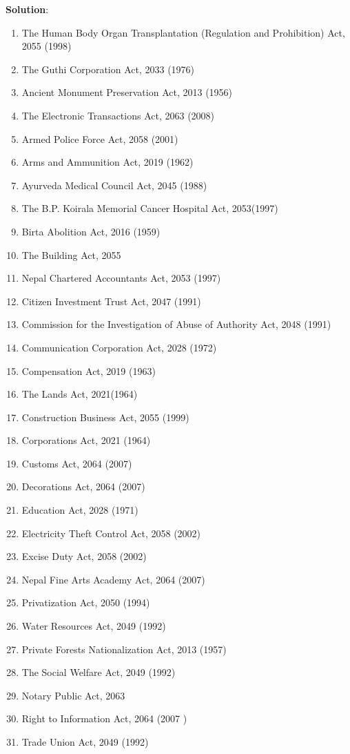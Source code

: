 \documentclass[
  openany]{book}
\newenvironment{solution}{ {\bfseries Solution}:}{}
\begin{document}
\begin{questions}
\begin{solution}
\begin{enumerate}
\item The Human Body Organ Transplantation (Regulation and Prohibition) Act, 2055 (1998)
\item The Guthi Corporation Act, 2033 (1976)
\item Ancient Monument Preservation Act, 2013 (1956)
\item The Electronic Transactions Act, 2063 (2008)
\item Armed Police Force Act, 2058 (2001)
\item Arms and Ammunition Act, 2019 (1962)
\item Ayurveda Medical Council Act, 2045 (1988)
\item The B.P. Koirala Memorial Cancer Hospital Act, 2053(1997)
\item Birta Abolition Act, 2016 (1959)
\item The Building Act, 2055
\item Nepal Chartered Accountants Act, 2053 (1997)
\item Citizen Investment Trust Act, 2047 (1991)
\item Commission for the Investigation of Abuse of Authority Act, 2048 (1991)
\item Communication Corporation Act, 2028 (1972)
\item Compensation Act, 2019 (1963)
\item The Lands Act, 2021(1964)
\item Construction Business Act, 2055 (1999)
\item Corporations Act, 2021 (1964)
\item Customs Act, 2064 (2007)
\item Decorations Act, 2064 (2007)
\item Education Act, 2028 (1971)
\item Electricity Theft Control Act, 2058 (2002)
\item Excise Duty Act, 2058 (2002)
\item Nepal Fine Arts Academy Act, 2064 (2007)
\item Privatization Act, 2050 (1994)
\item Water Resources Act, 2049 (1992)
\item Private Forests Nationalization Act, 2013 (1957)
\item The Social Welfare Act, 2049 (1992)
\item Notary Public Act, 2063
\item Right to Information Act, 2064 (2007 )
\item Trade Union Act, 2049 (1992)

\end{enumerate}
\end{solution}
\end{questions}
\end{document}
